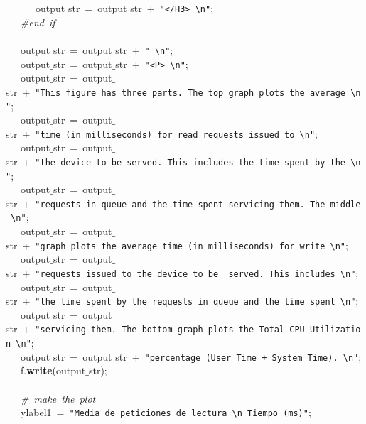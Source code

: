 \mbox{}\ \ \ \ \ \ output$\_$str\ =\ output$\_$str\ +\ \texttt{"{}\textless{}/H3\textgreater{}\ \textbackslash{}n"{}}; \\
\mbox{}\ \ \ \textit{\#end\ if} \\
\mbox{}\ \ \  \\
\mbox{}\ \ \ output$\_$str\ =\ output$\_$str\ +\ \texttt{"{}\ \textbackslash{}n"{}}; \\
\mbox{}\ \ \ output$\_$str\ =\ output$\_$str\ +\ \texttt{"{}\textless{}P\textgreater{}\ \textbackslash{}n"{}}; \\
\mbox{}\ \ \ output$\_$str\ =\ output$\_$str\ +\ \texttt{"{}This\ figure\ has\ three\ parts.\ The\ top\ graph\ plots\ the\ average\ \textbackslash{}n"{}}; \\
\mbox{}\ \ \ output$\_$str\ =\ output$\_$str\ +\ \texttt{"{}time\ (in\ milliseconds)\ for\ read\ requests\ issued\ to\ \textbackslash{}n"{}}; \\
\mbox{}\ \ \ output$\_$str\ =\ output$\_$str\ +\ \texttt{"{}the\ device\ to\ be\ served.\ This\ includes\ the\ time\ spent\ by\ the\ \textbackslash{}n"{}}; \\
\mbox{}\ \ \ output$\_$str\ =\ output$\_$str\ +\ \texttt{"{}requests\ in\ queue\ and\ the\ time\ spent\ servicing\ them.\ The\ middle\ \textbackslash{}n"{}}; \\
\mbox{}\ \ \ output$\_$str\ =\ output$\_$str\ +\ \texttt{"{}graph\ plots\ the\ average\ time\ (in\ milliseconds)\ for\ write\ \textbackslash{}n"{}}; \\
\mbox{}\ \ \ output$\_$str\ =\ output$\_$str\ +\ \texttt{"{}requests\ issued\ to\ the\ device\ to\ be\ \ served.\ This\ includes\ \textbackslash{}n"{}}; \\
\mbox{}\ \ \ output$\_$str\ =\ output$\_$str\ +\ \texttt{"{}the\ time\ spent\ by\ the\ requests\ in\ queue\ and\ the\ time\ spent\ \textbackslash{}n"{}}; \\
\mbox{}\ \ \ output$\_$str\ =\ output$\_$str\ +\ \texttt{"{}servicing\ them.\ The\ bottom\ graph\ plots\ the\ Total\ CPU\ Utilization\ \textbackslash{}n"{}}; \\
\mbox{}\ \ \ output$\_$str\ =\ output$\_$str\ +\ \texttt{"{}percentage\ (User\ Time\ +\ System\ Time).\ \textbackslash{}n"{}}; \\
\mbox{}\ \ \ f.\textbf{write}(output$\_$str); \\
\mbox{}\ \ \  \\
\mbox{}\ \ \ \textit{\#\ make\ the\ plot} \\
\mbox{}\ \ \ ylabel1\ =\ \texttt{"{}Media\ de\ peticiones\ de\ lectura\ \textbackslash{}n\ Tiempo\ (ms)"{}}; \\
